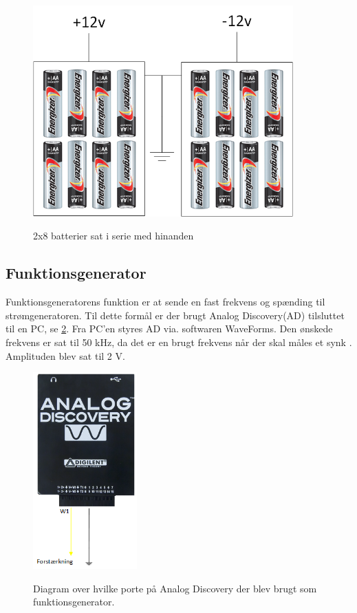 \begin{figure}[H]
\centering
{\includegraphics[width=10cm]
{Figure/12vbatteri}}
\caption{2x8 batterier sat i serie med hinanden}
\label{fig:12vbatteri}
\end{figure}

\subsection{Funktionsgenerator}
Funktionsgeneratorens funktion er at sende en fast frekvens og spænding til strømgeneratoren. Til dette formål er der brugt Analog Discovery(AD) tilsluttet til en PC, se \ref{fig:analogdis}. Fra PC'en styres AD via. softwaren WaveForms. Den ønskede frekvens er sat til 50 kHz, da det er en brugt frekvens når der skal måles et synk\cite{Kusuhara2004} \citep{Brantlov2017}. Amplituden blev sat til 2 V. 

\begin{figure}[H]
\centering
{\includegraphics[width=4cm]
{Figure/analogdis}}
\caption{Diagram over hvilke porte på Analog Discovery der blev brugt  som funktionsgenerator.}
\label{fig:analogdis}
\end{figure}


